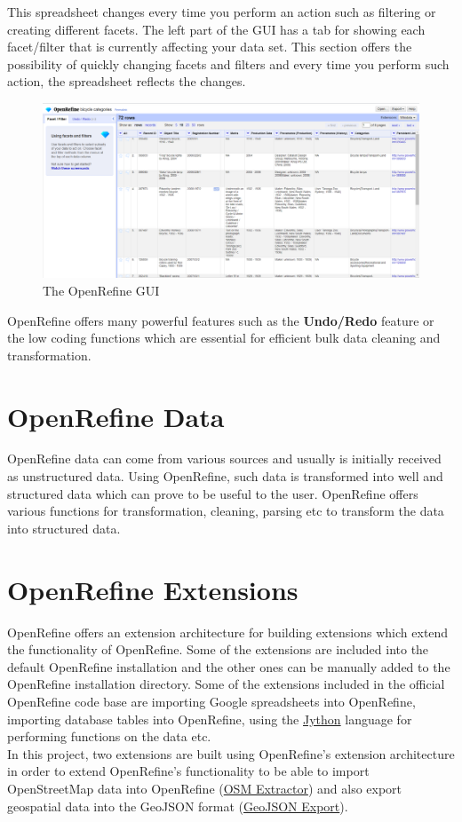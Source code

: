 This spreadsheet changes every time you perform an action such as filtering or creating different facets.
The left part of the GUI has a tab for showing each facet/filter that is currently affecting your data set.
This section offers the possibility of quickly changing facets and filters and every time you perform such action,
the spreadsheet reflects the changes.~\cite{OpenRefineCoreDump}\\
\begin{figure}[H]
    \includegraphics[width=\linewidth]{./Figures/OpenRefine/openrefine_gui}
    \caption{The OpenRefine GUI}
\end{figure}
OpenRefine offers many powerful features such as the \textbf{Undo/Redo} feature or the low coding functions which are essential for efficient bulk data cleaning and transformation.
\pagebreak
\section{OpenRefine Data}
OpenRefine data can come from various sources and usually is initially received as unstructured data. Using OpenRefine, such data is transformed
into well and structured data which can prove to be useful to the user. OpenRefine offers various functions for transformation, cleaning, parsing etc to
transform the data into structured data.
\section{OpenRefine Extensions}
OpenRefine offers an extension architecture for building extensions which extend the functionality of OpenRefine. Some of the extensions are included
into the default OpenRefine installation and the other ones can be manually added to the OpenRefine installation directory. Some of the extensions included
in the official OpenRefine code base are importing Google spreadsheets into OpenRefine, importing database tables into OpenRefine, using the \href{https://www.jython.org/}{Jython}
language for performing functions on the data etc.\\
\newline
In this project, two extensions are built using OpenRefine's extension architecture in order to extend OpenRefine's functionality to
be able to import OpenStreetMap data into OpenRefine (\hyperref[ch:the-osm-extractor-extension]{OSM Extractor}) and also export geospatial
data into the GeoJSON format (\hyperref[ch:the-geojson-export-extension]{GeoJSON Export}).
